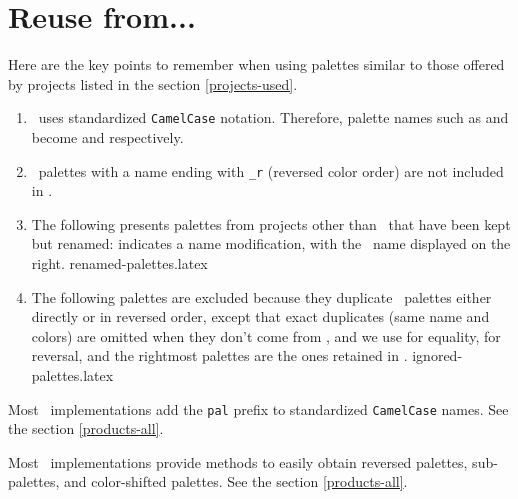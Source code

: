\documentclass{tutodoc}
\begin{document}
\section{Reuse from...}

Here are the key points to remember when using palettes similar to those offered by projects listed in the section \ref{projects-used}.
%
\begin{enumerate}
	\item 
	\thisproj\ uses standardized \verb+CamelCase+ notation. Therefore, palette names such as  and  become  and  respectively.

    
    \item \matplotlib\ palettes with a name ending with \verb+_r+ (reversed color order) are not included in \thisproj.

    
    \item The following presents palettes from projects other than \matplotlib\ that have been kept but renamed:
    \boxed{{\Rightarrow}\vphantom{pM}} indicates a name modification,
with the \thisproj\ name displayed on the right.
    {renamed-palettes.latex}

    
    \item The following palettes are excluded because they duplicate \thisproj\ palettes either directly or in reversed order,
    except that exact duplicates (same name and colors) are omitted when they don't come from \matplotlib, and we use
    \boxed{{=}\vphantom{pM}} for equality,
    \boxed{{\rightleftharpoons}\vphantom{pM}} for reversal,
    and the rightmost palettes are the ones retained in \thisproj.
    {ignored-palettes.latex}
\end{enumerate}




\begin{tdoccaut}
    Most \thisproj\ implementations add the \verb+pal+ prefix to standardized \verb+CamelCase+ names.
    See the section \ref{products-all}.
\end{tdoccaut}


\begin{tdocnote}
    Most \thisproj\ implementations provide methods to easily obtain reversed palettes, sub-palettes, and color-shifted palettes.
    See the section \ref{products-all}.
\end{tdocnote}
\end{document}
